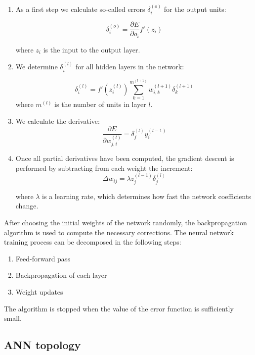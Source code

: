 \begin{enumerate}
\itemsep0em
\item As a first step we calculate so-called errors $\delta_{i}^{(o)}$ for the output units:

\begin{equation}
\delta_{i}^{(o)} = \frac{\partial E}{\partial o_{i}} f'(z_{i})
\end{equation}

where $z_{i}$ is the input to the output layer.
\item We determine $\delta_{i}^{(l)}$ for all hidden layers in the network:

\begin{equation}
\delta_{i}^{(l)} = f'(z_{i}^{(l)}) \sum_{k=1}^{m^{(l+1)}} w_{i,k}^{(l+1)} \delta_{k}^{(l+1)}
\end{equation}
where $m^{(l)}$ is the number of units in layer $l$.
\item We calculate the derivative:
\begin{equation}
\frac{\partial E}{\partial w_{j,i}^{(l)}} = \delta_{j}^{(l)}y_{i}^{(l-1)}
\end{equation}
\item Once all partial derivatives have been computed, the gradient descent is performed by subtracting from each weight the increment:
\begin{equation}
\Delta w_{ij} = \lambda z_{j}^{(l-1)} \delta_{j}^{(l)}
\end{equation}

where $\lambda$ is a learning rate, which determines how fast the network coefficients change. 
\end{enumerate}

After choosing the initial weights of the network randomly, the backpropagation algorithm is used to compute the necessary corrections. The neural network training process can be decomposed in the following steps:

\begin{enumerate}
\itemsep0em 
\item Feed-forward pass
\item Backpropagation of each layer
\item Weight updates
\end{enumerate}
The algorithm is stopped when the value of the error function is sufficiently small.


\subsection{ANN topology}

